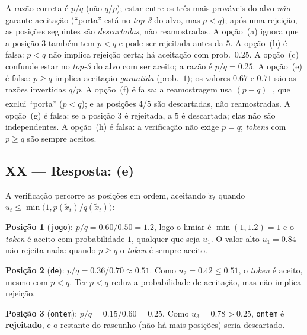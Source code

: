 \documentclass{dlproblemset}
\begin{document}
A razão correta é $p/q$ (não $q/p$); estar entre os três mais prováveis
do alvo \emph{não} garante aceitação (``porta'' está no \textit{top-3} do alvo, mas
$p < q$); após uma rejeição, as posições seguintes são \emph{descartadas}, não
reamostradas.
A opção~(a) ignora que a posição $3$ também tem $p < q$ e pode ser rejeitada antes da $5$.
A opção~(b) é falsa: $p < q$ não implica rejeição certa; há aceitação com prob.\ $0.25$.
A opção~(c) confunde estar no \textit{top-3} do alvo com ser aceito; a razão é $p/q = 0.25$.
A opção~(e) é falsa: $p \ge q$ implica aceitação \emph{garantida} (prob.\ $1$); os valores
$0.67$ e $0.71$ são as razões invertidas $q/p$.
A opção~(f) é falsa: a reamostragem usa $(p-q)_+$, que exclui ``porta'' ($p < q$); e as
posições $4$/$5$ são descartadas, não reamostradas.
A opção~(g) é falsa: se a posição $3$ é rejeitada, a $5$ é descartada; elas não são
independentes.
A opção~(h) é falsa: a verificação não exige $p = q$; \textit{tokens} com $p \ge q$ são
sempre aceitos.

\subsection*{XX — Resposta: (e)}
A verificação percorre as posições em ordem, aceitando $\tilde{x}_t$ quando
$u_t \le \min\bigl(1, p(\tilde{x}_t)/q(\tilde{x}_t)\bigr)$:

\textbf{Posição 1} (\texttt{jogo}): $p/q = 0.60/0.50 = 1.2$, logo o limiar é
$\min(1, 1.2) = 1$ e o \textit{token} é aceito com probabilidade $1$, qualquer que seja
$u_1$. O valor alto $u_1 = 0.84$ não rejeita nada: quando $p \ge q$ o \textit{token} é
sempre aceito.

\textbf{Posição 2} (\texttt{de}): $p/q = 0.36/0.70 \approx 0.51$. Como
$u_2 = 0.42 \le 0.51$, o \textit{token} é aceito, mesmo com $p < q$. Ter $p < q$ reduz
a probabilidade de aceitação, mas não implica rejeição.

\textbf{Posição 3} (\texttt{ontem}): $p/q = 0.15/0.60 = 0.25$. Como
$u_3 = 0.78 > 0.25$, \texttt{ontem} é \textbf{rejeitado}, e o restante do rascunho (não
há mais posições) seria descartado.
\end{document}
